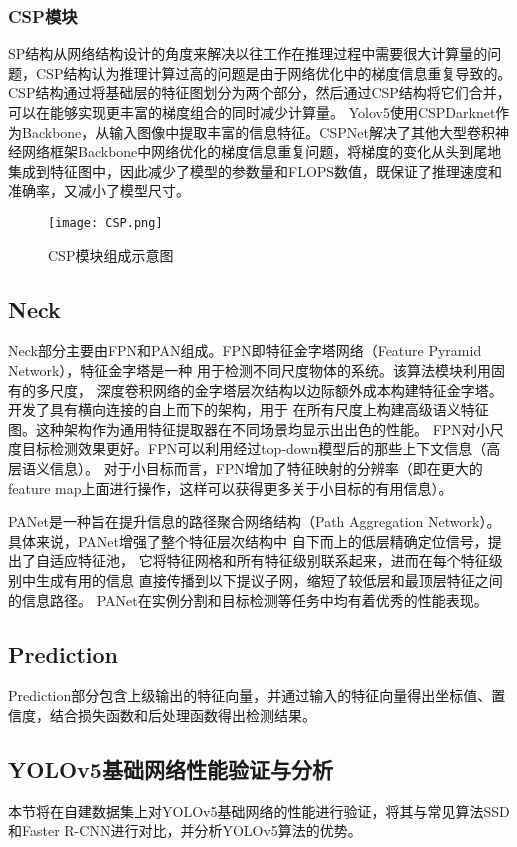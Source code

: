 \subsubsection{CSP模块}
SP结构从网络结构设计的角度来解决以往工作在推理过程中需要很大计算量的问题，CSP结构认为推理计算过高的问题是由于网络优化中的梯度信息重复导致的。CSP结构通过将基础层的特征图划分为两个部分，然后通过CSP结构将它们合并，可以在能够实现更丰富的梯度组合的同时减少计算量。
Yolov5使用CSPDarknet作为Backbone，从输入图像中提取丰富的信息特征。CSPNet解决了其他大型卷积神经网络框架Backbone中网络优化的梯度信息重复问题，将梯度的变化从头到尾地集成到特征图中，因此减少了模型的参数量和FLOPS数值，既保证了推理速度和准确率，又减小了模型尺寸。

\begin{figure}[h]
  \centering
  \texttt{[image: CSP.png]}
  \caption{CSP模块组成示意图}
  \label{csp}
\end{figure}

\subsection{Neck}
Neck部分主要由FPN和PAN组成。FPN即特征金字塔网络（Feature Pyramid Network），特征金字塔是一种
用于检测不同尺度物体的系统。该算法模块利用固有的多尺度，
深度卷积网络的金字塔层次结构以边际额外成本构建特征金字塔。开发了具有横向连接的自上而下的架构，用于
在所有尺度上构建高级语义特征图。这种架构作为通用特征提取器在不同场景均显示出出色的性能。
FPN对小尺度目标检测效果更好。FPN可以利用经过top-down模型后的那些上下文信息（高层语义信息）。
对于小目标而言，FPN增加了特征映射的分辨率（即在更大的feature map上面进行操作，这样可以获得更多关于小目标的有用信息）。

PANet是一种旨在提升信息的路径聚合网络结构（Path Aggregation Network）。
具体来说，PANet增强了整个特征层次结构中
自下而上的低层精确定位信号，提出了自适应特征池，
它将特征网格和所有特征级别联系起来，进而在每个特征级别中生成有用的信息
直接传播到以下提议子网，缩短了较低层和最顶层特征之间的信息路径。
PANet在实例分割和目标检测等任务中均有着优秀的性能表现。

\subsection{Prediction}
Prediction部分包含上级输出的特征向量，并通过输入的特征向量得出坐标值、置信度，结合损失函数和后处理函数得出检测结果。

\subsection{YOLOv5基础网络性能验证与分析}
本节将在自建数据集上对YOLOv5基础网络的性能进行验证，将其与常见算法SSD和Faster R-CNN进行对比，并分析YOLOv5算法的优势。

